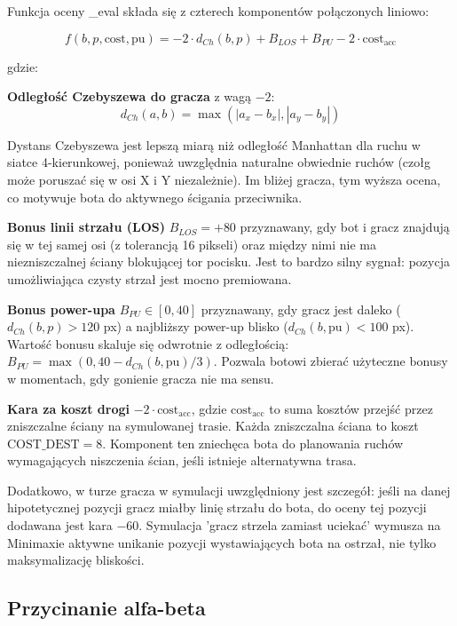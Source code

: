 Funkcja oceny \_eval składa się z czterech komponentów połączonych liniowo:
 
\begin{equation}
f(b, p, \text{cost}, \text{pu}) = -2 \cdot d_{Ch}(b, p) + B_{LOS} + B_{PU} - 2 \cdot \text{cost}_\text{acc}
\end{equation}
 
gdzie:
 
\textbf{Odległość Czebyszewa do gracza} z wagą $-2$:
\begin{equation}
d_{Ch}(a, b) = \max(|a_x - b_x|, |a_y - b_y|)
\end{equation}
 
Dystans Czebyszewa jest lepszą miarą niż odległość Manhattan dla ruchu w siatce 4-kierunkowej, 
ponieważ uwzględnia naturalne obwiednie ruchów (czołg może poruszać się w osi X i Y niezależnie). 
Im bliżej gracza, tym wyższa ocena, co motywuje bota do aktywnego ścigania przeciwnika.
 
\textbf{Bonus linii strzału (LOS)} $B_{LOS} = +80$ przyznawany, gdy bot i gracz znajdują się w tej samej osi 
(z tolerancją 16 pikseli) oraz między nimi nie ma niezniszczalnej ściany blokującej tor pocisku. 
Jest to bardzo silny sygnał: pozycja umożliwiająca czysty strzał jest mocno premiowana.
 
\textbf{Bonus power-upa} $B_{PU} \in [0, 40]$ przyznawany, gdy gracz jest daleko ($d_{Ch}(b, p) > 120$ px) 
a najbliższy power-up blisko ($d_{Ch}(b, \text{pu}) < 100$ px). Wartość bonusu skaluje się odwrotnie z 
odległością: $B_{PU} = \max(0, 40 - d_{Ch}(b, \text{pu})/3)$. Pozwala botowi zbierać użyteczne bonusy w momentach, gdy 
gonienie gracza nie ma sensu.
 
\textbf{Kara za koszt drogi} $-2 \cdot \text{cost}_\text{acc}$, gdzie $\text{cost}_\text{acc}$ to suma kosztów przejść 
przez zniszczalne ściany na symulowanej trasie. Każda zniszczalna ściana to koszt $\text{COST\_DEST} = 8$. 
Komponent ten zniechęca bota do planowania ruchów wymagających niszczenia ścian, jeśli istnieje alternatywna trasa.
 
Dodatkowo, w turze gracza w symulacji uwzględniony jest szczegół: jeśli na danej hipotetycznej 
pozycji gracz miałby linię strzału do bota, do oceny tej pozycji dodawana jest kara $-60$. 
Symulacja 'gracz strzela zamiast uciekać' wymusza na Minimaxie aktywne unikanie pozycji wystawiających bota 
na ostrzał, nie tylko maksymalizację bliskości.

\subsection{Przycinanie alfa-beta}

